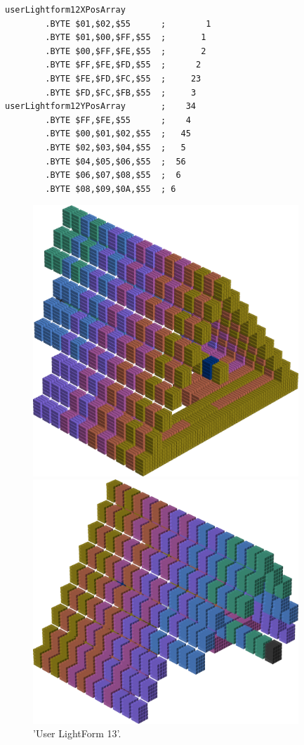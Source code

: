 \begin{lstlisting}
userLightform12XPosArray
        .BYTE $01,$02,$55      ;        1
        .BYTE $01,$00,$FF,$55  ;       1 
        .BYTE $00,$FF,$FE,$55  ;       2 
        .BYTE $FF,$FE,$FD,$55  ;      2  
        .BYTE $FE,$FD,$FC,$55  ;     23  
        .BYTE $FD,$FC,$FB,$55  ;     3   
userLightform12YPosArray       ;    34  
        .BYTE $FF,$FE,$55      ;    4   
        .BYTE $00,$01,$02,$55  ;   45   
        .BYTE $02,$03,$04,$55  ;   5    
        .BYTE $04,$05,$06,$55  ;  56    
        .BYTE $06,$07,$08,$55  ;  6     
        .BYTE $08,$09,$0A,$55  ; 6      
\end{lstlisting}


\begin{figure}[H]
    \centering
    \begin{adjustbox}{width=10cm,center}
      \includegraphics[width=10cm]{src/colorspace_patterns/pattern21-45.png}%
    \end{adjustbox}
    \begin{adjustbox}{width=10cm}
      \includegraphics[width=10cm]{src/colorspace_patterns/pattern21-225.png}%
    \end{adjustbox}
\caption{'User LightForm 13'.}
\end{figure}
\clearpage

